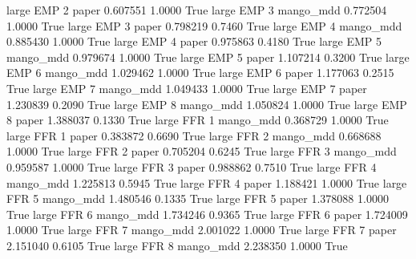      large      EMP                 2                 paper      0.607551      1.0000    True
     large      EMP                 3             mango_mdd      0.772504      1.0000    True
     large      EMP                 3                 paper      0.798219      0.7460    True
     large      EMP                 4             mango_mdd      0.885430      1.0000    True
     large      EMP                 4                 paper      0.975863      0.4180    True
     large      EMP                 5             mango_mdd      0.979674      1.0000    True
     large      EMP                 5                 paper      1.107214      0.3200    True
     large      EMP                 6             mango_mdd      1.029462      1.0000    True
     large      EMP                 6                 paper      1.177063      0.2515    True
     large      EMP                 7             mango_mdd      1.049433      1.0000    True
     large      EMP                 7                 paper      1.230839      0.2090    True
     large      EMP                 8             mango_mdd      1.050824      1.0000    True
     large      EMP                 8                 paper      1.388037      0.1330    True
     large      FFR                 1             mango_mdd      0.368729      1.0000    True
     large      FFR                 1                 paper      0.383872      0.6690    True
     large      FFR                 2             mango_mdd      0.668688      1.0000    True
     large      FFR                 2                 paper      0.705204      0.6245    True
     large      FFR                 3             mango_mdd      0.959587      1.0000    True
     large      FFR                 3                 paper      0.988862      0.7510    True
     large      FFR                 4             mango_mdd      1.225813      0.5945    True
     large      FFR                 4                 paper      1.188421      1.0000    True
     large      FFR                 5             mango_mdd      1.480546      0.1335    True
     large      FFR                 5                 paper      1.378088      1.0000    True
     large      FFR                 6             mango_mdd      1.734246      0.9365    True
     large      FFR                 6                 paper      1.724009      1.0000    True
     large      FFR                 7             mango_mdd      2.001022      1.0000    True
     large      FFR                 7                 paper      2.151040      0.6105    True
     large      FFR                 8             mango_mdd      2.238350      1.0000    True
